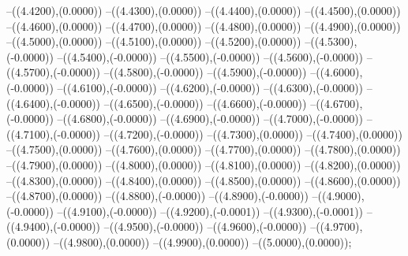 {	--({\sx*(4.4200)},{\sy*(0.0000)})
	--({\sx*(4.4300)},{\sy*(0.0000)})
	--({\sx*(4.4400)},{\sy*(0.0000)})
	--({\sx*(4.4500)},{\sy*(0.0000)})
	--({\sx*(4.4600)},{\sy*(0.0000)})
	--({\sx*(4.4700)},{\sy*(0.0000)})
	--({\sx*(4.4800)},{\sy*(0.0000)})
	--({\sx*(4.4900)},{\sy*(0.0000)})
	--({\sx*(4.5000)},{\sy*(0.0000)})
	--({\sx*(4.5100)},{\sy*(0.0000)})
	--({\sx*(4.5200)},{\sy*(0.0000)})
	--({\sx*(4.5300)},{\sy*(-0.0000)})
	--({\sx*(4.5400)},{\sy*(-0.0000)})
	--({\sx*(4.5500)},{\sy*(-0.0000)})
	--({\sx*(4.5600)},{\sy*(-0.0000)})
	--({\sx*(4.5700)},{\sy*(-0.0000)})
	--({\sx*(4.5800)},{\sy*(-0.0000)})
	--({\sx*(4.5900)},{\sy*(-0.0000)})
	--({\sx*(4.6000)},{\sy*(-0.0000)})
	--({\sx*(4.6100)},{\sy*(-0.0000)})
	--({\sx*(4.6200)},{\sy*(-0.0000)})
	--({\sx*(4.6300)},{\sy*(-0.0000)})
	--({\sx*(4.6400)},{\sy*(-0.0000)})
	--({\sx*(4.6500)},{\sy*(-0.0000)})
	--({\sx*(4.6600)},{\sy*(-0.0000)})
	--({\sx*(4.6700)},{\sy*(-0.0000)})
	--({\sx*(4.6800)},{\sy*(-0.0000)})
	--({\sx*(4.6900)},{\sy*(-0.0000)})
	--({\sx*(4.7000)},{\sy*(-0.0000)})
	--({\sx*(4.7100)},{\sy*(-0.0000)})
	--({\sx*(4.7200)},{\sy*(-0.0000)})
	--({\sx*(4.7300)},{\sy*(0.0000)})
	--({\sx*(4.7400)},{\sy*(0.0000)})
	--({\sx*(4.7500)},{\sy*(0.0000)})
	--({\sx*(4.7600)},{\sy*(0.0000)})
	--({\sx*(4.7700)},{\sy*(0.0000)})
	--({\sx*(4.7800)},{\sy*(0.0000)})
	--({\sx*(4.7900)},{\sy*(0.0000)})
	--({\sx*(4.8000)},{\sy*(0.0000)})
	--({\sx*(4.8100)},{\sy*(0.0000)})
	--({\sx*(4.8200)},{\sy*(0.0000)})
	--({\sx*(4.8300)},{\sy*(0.0000)})
	--({\sx*(4.8400)},{\sy*(0.0000)})
	--({\sx*(4.8500)},{\sy*(0.0000)})
	--({\sx*(4.8600)},{\sy*(0.0000)})
	--({\sx*(4.8700)},{\sy*(0.0000)})
	--({\sx*(4.8800)},{\sy*(-0.0000)})
	--({\sx*(4.8900)},{\sy*(-0.0000)})
	--({\sx*(4.9000)},{\sy*(-0.0000)})
	--({\sx*(4.9100)},{\sy*(-0.0000)})
	--({\sx*(4.9200)},{\sy*(-0.0001)})
	--({\sx*(4.9300)},{\sy*(-0.0001)})
	--({\sx*(4.9400)},{\sy*(-0.0000)})
	--({\sx*(4.9500)},{\sy*(-0.0000)})
	--({\sx*(4.9600)},{\sy*(-0.0000)})
	--({\sx*(4.9700)},{\sy*(0.0000)})
	--({\sx*(4.9800)},{\sy*(0.0000)})
	--({\sx*(4.9900)},{\sy*(0.0000)})
	--({\sx*(5.0000)},{\sy*(0.0000)});
}
